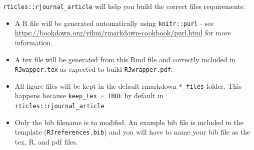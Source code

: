 \texttt{rticles::rjournal\_article} will help you build the correct
files requirements:

\begin{itemize}
\tightlist
\item
  A R file will be generated automatically using \texttt{knitr::purl} -
  see \url{https://bookdown.org/yihui/rmarkdown-cookbook/purl.html} for
  more information.
\item
  A tex file will be generated from this Rmd file and correctly included
  in \texttt{RJwapper.tex} as expected to build \texttt{RJwrapper.pdf}.
\item
  All figure files will be kept in the default rmarkdown
  \texttt{*\_files} folder. This happens because
  \texttt{keep\_tex\ =\ TRUE} by default in
  \texttt{rticles::rjournal\_article}
\item
  Only the bib filename is to modifed. An example bib file is included
  in the template (\texttt{RJreferences.bib}) and you will have to name
  your bib file as the tex, R, and pdf files.
\end{itemize}



\address{%
Emi Tanaka\\
Monash University\\%
Monash University\\ Clayton campus, VIC 3800, Australia\\
%
\url{http://emitanaka.org/}%
\\\textit{ORCiD: \href{https://orcid.org/0000-0002-1455-259X}{0000-0002-1455-259X}}%
\\\href{mailto:emi.tanaka@monash.edu}{\nolinkurl{emi.tanaka@monash.edu}}
}
